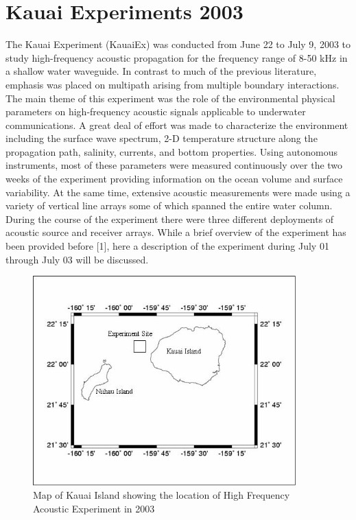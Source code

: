 
\chapter{Kauai Experiments 2003}
The Kauai Experiment (KauaiEx) was conducted from June 22 to July 9,
2003 to study high-frequency acoustic propagation for the frequency
range of 8-50 kHz in a shallow water waveguide. In contrast to much
of the previous literature, emphasis was placed on multipath arising
from multiple boundary interactions. The main theme of this
experiment was the role of the environmental physical parameters on
high-frequency acoustic signals applicable to underwater
communications. A great deal of effort was made to characterize the
environment including the surface wave spectrum, 2-D temperature
structure along the propagation path, salinity, currents, and bottom
properties. Using autonomous instruments, most of these parameters
were measured continuously over the two weeks of the experiment
providing information on the ocean volume and surface variability.
At the same time, extensive acoustic measurements were made using a
variety of vertical line arrays some of which spanned the entire
water column. During the course of the experiment there were three
different deployments of acoustic source and receiver arrays. While
a brief overview of the experiment has been provided before [1],
here a description of the experiment during July 01 through July 03
will be discussed.
\begin{figure}[htb]
\includegraphics[width=4in]{experimentsite.JPG}
\caption{\normalsize  Map of Kauai Island showing the location of
High Frequency Acoustic Experiment in 2003
}\label{fig-experimentsite}
\end{figure}

